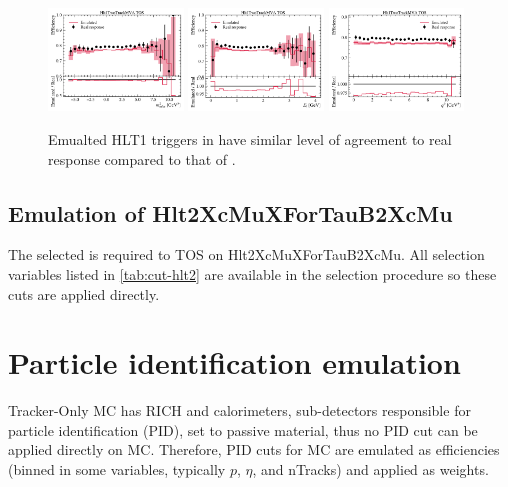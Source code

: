 \begin{figure}[ht]
    \includegraphics[width=0.32\textwidth]{
        ./figs-mc-emulation/emulate-hlt1/b0_Hlt1TwoTrackMVA_TOS_mmiss2.pdf
    }
    \includegraphics[width=0.32\textwidth]{
        ./figs-mc-emulation/emulate-hlt1/b0_Hlt1TwoTrackMVA_TOS_el.pdf
    }
    \includegraphics[width=0.32\textwidth]{
        ./figs-mc-emulation/emulate-hlt1/b0_Hlt1TwoTrackMVA_TOS_q2.pdf
    }

    \caption{
        Emualted HLT1 triggers in \Bz have similar level of agreement to real
        response compared to that of \Bp.
    }
    \label{fig:hlt1-twotrackmva-emu}
\end{figure}


\subsection{Emulation of Hlt2XcMuXForTauB2XcMu}

The selected \B is required to TOS on Hlt2XcMuXForTauB2XcMu. All selection
variables listed in \cref{tab:cut-hlt2} are available in the selection procedure
so these cuts are applied directly.


\section{Particle identification emulation}
\label{ref:mc-emulation:pid}

Tracker-Only MC has RICH and calorimeters, sub-detectors responsible for
particle identification (PID), set to passive material, thus no PID cut can be
applied directly on MC.
Therefore, PID cuts for MC are emulated as efficiencies (binned in some
variables, typically $p$, $\eta$, and nTracks) and applied as weights.

